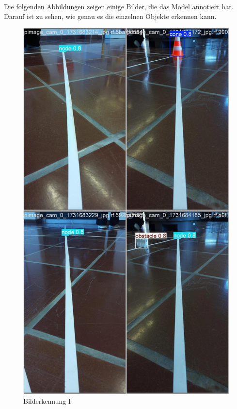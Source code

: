 Die folgenden Abbildungen zeigen einige Bilder, die das Model annotiert hat. Darauf ist zu sehen, wie genau es die einzelnen Objekte erkennen kann.

\begin{figure}[H]
  \centering
   \begin{minipage}[b]{0.28\textwidth}
    \centering
    \includegraphics[width=\textwidth]{assets/IT/yolo/val_batch0_pred.jpg}
    \caption{Bilderkennung I}
    \label{fig:yolo-i}
  \end{minipage}

\end{figure}
